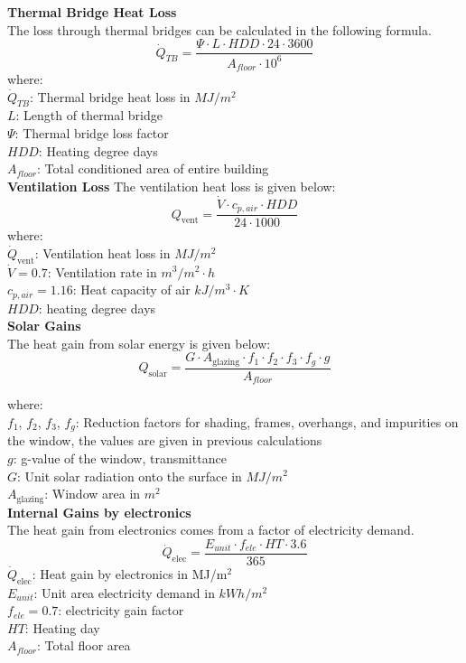 \documentclass[a4paper, oneside]{discothesis}
\begin{document}
			\textbf{Thermal Bridge Heat Loss}\\
				The loss through thermal bridges can be calculated in the following formula.\\
				\[\dot{Q}_{TB} = \frac{\Psi \cdot L \cdot HDD \cdot 24 \cdot 3600}{A_{floor} \cdot 10^6}\]
				where:\\
				$\dot{Q}_{TB}$: Thermal bridge heat loss in $MJ/m^2$\\
				$L$: Length of thermal bridge\\
				$\Psi$: Thermal bridge loss factor\\ 
				$HDD$: Heating degree days\\
				$A_{floor}$: Total conditioned area of entire building\\


			\textbf{Ventilation Loss}
				The ventilation heat loss is given below:\\
				\[Q_{\text{vent}} = \frac{\dot{V} \cdot c_{p,air} \cdot HDD}{24 \cdot 1000}\]
				where:\\
				$\dot{Q}_{\text{vent}}$: Ventilation heat loss in $MJ/m^2$\\
				$\dot{V} = 0.7$: Ventilation rate in $m^3/m^2\cdot h$\\
				$c_{p,air} = 1.16$: Heat capacity of air $kJ/m^3 \cdot K$\\
				$HDD$: heating degree days\\

			\textbf{Solar Gains}\\
			The heat gain from solar energy is given below: \\
			\[Q_{\text{solar}} = \frac{G \cdot A_{\text{glazing}} \cdot f_1 \cdot f_2 \cdot f_3 \cdot f_g \cdot g}{A_{floor}} \]

			where:\\
			$f_1$, $f_2$, $f_3$, $f_g$: Reduction factors for shading, frames, overhangs, and impurities on the window, the values are given in previous calculations\\
			$g$: g-value of the window, transmittance\\
			$G$: Unit solar radiation onto the surface in $MJ/m^2$\\
			$A_{\text{glazing}}$: Window area in $m^2$\\

			
			\textbf{Internal Gains by electronics}\\
			The heat gain from electronics comes from a factor of electricity demand.
			\[\dot{Q}_{\text{elec}} = \frac{E_{unit}  \cdot f_{ele} \cdot HT \cdot 3.6}{365} \]
			$\dot{Q}_{\text{elec}}$: Heat gain by electronics in MJ/m$^2$\\
			$E_{unit}$: Unit area electricity demand in $kWh/m^2$\\
			$f_{ele} = 0.7$: electricity gain factor\\
			$HT$: Heating day\\
			$A_{floor}$: Total floor area\\
\end{document}

